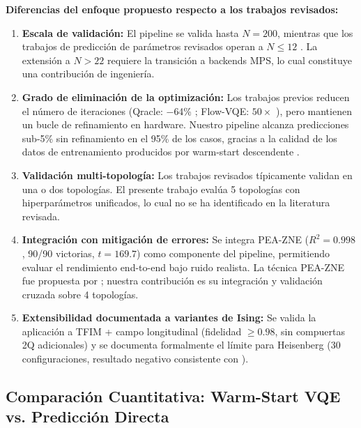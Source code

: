 \documentclass[11pt,a4paper,spanish]{book}
\begin{document}
\textbf{Diferencias del enfoque propuesto respecto a los trabajos revisados:}

\begin{enumerate}
    \item \textbf{Escala de validación:} El pipeline se valida hasta $N = 200$, mientras que los trabajos de predicción de parámetros revisados operan a $N \leq 12$ \citep{miao2024, zhang2025, zou2026}. La extensión a $N > 22$ requiere la transición a backends MPS, lo cual constituye una contribución de ingeniería.

    \item \textbf{Grado de eliminación de la optimización:} Los trabajos previos reducen el número de iteraciones (Qracle: $-$64\% \citep{zhang2025}; Flow-VQE: $50\times$ \citep{zou2026}), pero mantienen un bucle de refinamiento en hardware. Nuestro pipeline alcanza predicciones sub-5\% sin refinamiento en el 95\% de los casos, gracias a la calidad de los datos de entrenamiento producidos por warm-start descendente \citep{puig2025, schiffer2026}.

    \item \textbf{Validación multi-topología:} Los trabajos revisados típicamente validan en una o dos topologías. El presente trabajo evalúa 5 topologías con hiperparámetros unificados, lo cual no se ha identificado en la literatura revisada.

    \item \textbf{Integración con mitigación de errores:} Se integra PEA-ZNE ($R^2 = 0.998$, 90/90 victorias, $t = 169.7$) como componente del pipeline, permitiendo evaluar el rendimiento end-to-end bajo ruido realista. La técnica PEA-ZNE fue propuesta por \citet{kim2023}; nuestra contribución es su integración y validación cruzada sobre 4 topologías.

    \item \textbf{Extensibilidad documentada a variantes de Ising:} Se valida la aplicación a TFIM + campo longitudinal (fidelidad $\geq 0.98$, sin compuertas 2Q adicionales) y se documenta formalmente el límite para Heisenberg (30 configuraciones, resultado negativo consistente con \citet{wiersema2020, huang2026frustration}).
\end{enumerate}

\subsection{Comparación Cuantitativa: Warm-Start VQE vs. Predicción Directa}
\end{document}
